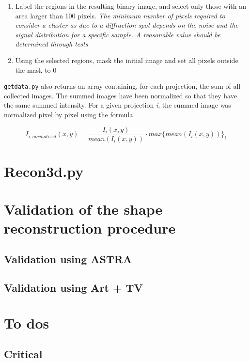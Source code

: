 \documentclass[11pt]{scrartcl}
\begin{document}
\begin{enumerate}
\begin{enumerate}
        \item Label the regions in the resulting binary image, and select only those with an area larger than 100 pixels. {\emph{The minimum number of pixels required to consider a cluster as due to a diffraction spot depends on the noise and the signal distribution for a specific sample. A reasonable value should be determined through tests}}
        
        \item Using the selected regions, mask the initial image and set all pixels outside the mask to 0
    \end{enumerate}
    
\end{enumerate}

{\texttt{getdata.py}} also returns an array containing, for each projection, the sum of all collected images. The summed images have been normalized so that they have the same summed intensity. For a given projection {\emph{i}}, the summed image was normalized pixel by pixel using the formula

\begin{equation}
    I_{i,normalized}(x,y) = \frac{I_i(x,y)}{mean(I_i(x,y))} \cdot max\{mean(I_i(x,y))\}_i
\end{equation}

\section{Recon3d.py}

\section{Validation of the shape reconstruction procedure}

\subsection{Validation using ASTRA}

\subsection{Validation using Art + TV}

\section{To dos}

\subsection{Critical}
\end{document}
